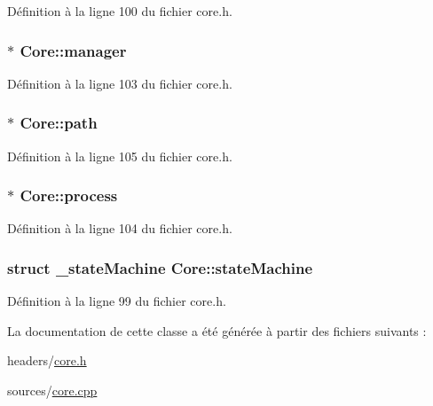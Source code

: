 Définition à la ligne 100 du fichier core.\-h.

\hypertarget{class_core_a834f8de7a2b8f18b19af83d6c05b9b3a}{
\subsubsection[{manager}]{$\ast$ Core\-::manager\hspace{0.3cm}{\ttfamily [private]}}}\label{class_core_a834f8de7a2b8f18b19af83d6c05b9b3a}


Définition à la ligne 103 du fichier core.\-h.

\hypertarget{class_core_a55b925c8acc13a0002112d48a054984e}{
\subsubsection[{path}]{$\ast$ Core\-::path\hspace{0.3cm}{\ttfamily [private]}}}\label{class_core_a55b925c8acc13a0002112d48a054984e}


Définition à la ligne 105 du fichier core.\-h.

\hypertarget{class_core_a7a18e37fde7d3ca4b1568225b51eaf0d}{
\subsubsection[{process}]{$\ast$ Core\-::process\hspace{0.3cm}{\ttfamily [private]}}}\label{class_core_a7a18e37fde7d3ca4b1568225b51eaf0d}


Définition à la ligne 104 du fichier core.\-h.

\hypertarget{class_core_a2eaa56d6855905faec8a1764db40892b}{
\subsubsection[{state\-Machine}]{\setlength{\rightskip}{0pt plus 5cm}struct {\bf \-\_\-state\-Machine} Core\-::state\-Machine\hspace{0.3cm}{\ttfamily [private]}}}\label{class_core_a2eaa56d6855905faec8a1764db40892b}


Définition à la ligne 99 du fichier core.\-h.



La documentation de cette classe a été générée à partir des fichiers suivants \-:\begin{DoxyCompactItemize}
\item 
headers/\hyperlink{core_8h}{core.\-h}\item 
sources/\hyperlink{core_8cpp}{core.\-cpp}\end{DoxyCompactItemize}
